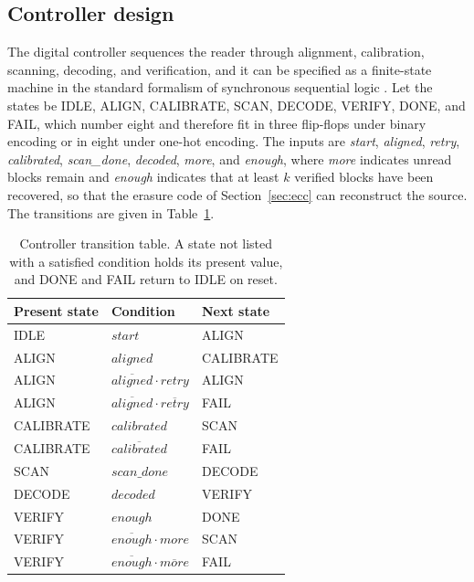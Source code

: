 \subsection{Controller design}\label{sec:controller}

The digital controller sequences the reader through alignment, calibration, scanning, decoding, and verification, and it can be specified as a finite-state machine in the standard formalism of synchronous sequential logic \cite{mano}. Let the states be IDLE, ALIGN, CALIBRATE, SCAN, DECODE, VERIFY, DONE, and FAIL, which number eight and therefore fit in three flip-flops under binary encoding or in eight under one-hot encoding. The inputs are \emph{start}, \emph{aligned}, \emph{retry}, \emph{calibrated}, \emph{scan\_done}, \emph{decoded}, \emph{more}, and \emph{enough}, where \emph{more} indicates unread blocks remain and \emph{enough} indicates that at least $k$ verified blocks have been recovered, so that the erasure code of Section~\ref{sec:ecc} can reconstruct the source. The transitions are given in Table~\ref{tab:fsm}.

\begin{table}[h]
\centering
\small
\begin{tabular}{@{}lll@{}}
\toprule
Present state & Condition & Next state \\
\midrule
IDLE & $\mathit{start}$ & ALIGN \\
ALIGN & $\mathit{aligned}$ & CALIBRATE \\
ALIGN & $\overline{\mathit{aligned}}\cdot\mathit{retry}$ & ALIGN \\
ALIGN & $\overline{\mathit{aligned}}\cdot\overline{\mathit{retry}}$ & FAIL \\
CALIBRATE & $\mathit{calibrated}$ & SCAN \\
CALIBRATE & $\overline{\mathit{calibrated}}$ & FAIL \\
SCAN & $\mathit{scan\_done}$ & DECODE \\
DECODE & $\mathit{decoded}$ & VERIFY \\
VERIFY & $\mathit{enough}$ & DONE \\
VERIFY & $\overline{\mathit{enough}}\cdot\mathit{more}$ & SCAN \\
VERIFY & $\overline{\mathit{enough}}\cdot\overline{\mathit{more}}$ & FAIL \\
\bottomrule
\end{tabular}
\caption{Controller transition table. A state not listed with a satisfied condition holds its present value, and DONE and FAIL return to IDLE on reset.}
\label{tab:fsm}
\end{table}

